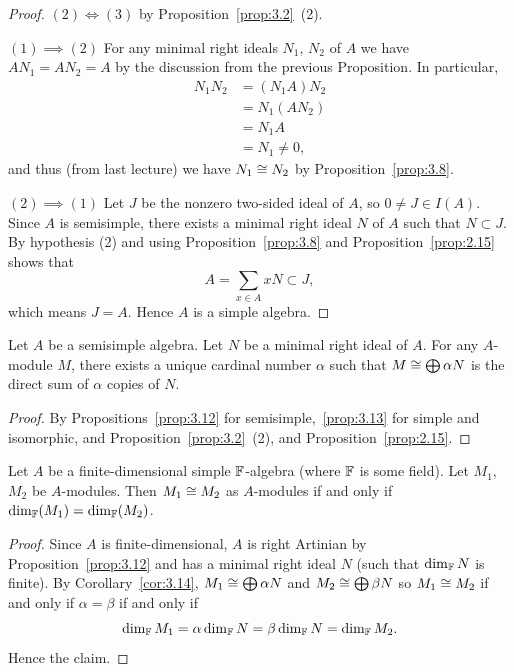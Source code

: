 \begin{proof}
$(2)\iff(3)$ by Proposition~\ref{prop:3.2}~(2).

$(1)\implies(2)$
For any minimal right ideals $N_{1}$, $N_{2}$ of $A$ we have
$AN_{1}=AN_{2}=A$ by the discussion from the previous Proposition. In particular,
\begin{subequations}
  \begin{align}
N_{1}N_{2} &= (N_{1}A)N_{2}\\
&=N_{1}(AN_{2})\\
&=N_{1}A\\
&=N_{1}\neq0,
  \end{align}
\end{subequations}
and thus (from last lecture) we have $N_{1}\cong N_{2}$ by Proposition~\ref{prop:3.8}.

$(2)\implies(1)$
Let $J$ be the nonzero two-sided ideal of $A$, so $0\neq J\in I(A)$.
Since $A$ is semisimple, there exists a minimal right ideal $N$ of $A$
such that $N\subset J$. By hypothesis (2) and using
Proposition~\ref{prop:3.8} and Proposition~\ref{prop:2.15} shows that
\begin{equation}
A=\sum_{x\in A}xN\subset J,
\end{equation}
which means $J=A$. Hence $A$ is a simple algebra.
\end{proof}

\begin{corollary}\label{cor:3.14}
Let $A$ be a semisimple algebra. Let $N$ be a minimal right ideal of
$A$. For any $A$-module $M$, there exists a unique cardinal number
$\alpha$ such that $M\cong\bigoplus\alpha N$ is the direct sum of
$\alpha$ copies of $N$.
\end{corollary}

\begin{proof}
By Propositions~\ref{prop:3.12} for semisimple,~\ref{prop:3.13} for
simple and isomorphic, and Proposition~\ref{prop:3.2}~(2),
and Proposition~\ref{prop:2.15}.
\end{proof}

\begin{corollary}\label{cor:3.15}
Let $A$ be a finite-dimensional simple $\mathbb{F}$-algebra (where $\mathbb{F}$ is
some field). Let $M_{1}$, $M_{2}$ be $A$-modules. Then $M_{1}\cong M_{2}$
as $A$-modules if and only if $\dim_{\mathbb{F}}(M_{1})=\dim_{\mathbb{F}}(M_{2})$.
\end{corollary}

\begin{proof}
Since $A$ is finite-dimensional, $A$ is right Artinian by
Proposition~\ref{prop:3.12} and has a minimal right ideal $N$ (such
that $\dim_{\mathbb{F}}N$ is finite). By Corollary~\ref{cor:3.14},
$M_{1}\cong\bigoplus\alpha N$ and $M_{2}\cong\bigoplus\beta N$ so
$M_{1}\cong M_{2}$ if and only if $\alpha=\beta$ if and only if
\begin{equation}
\dim_{\mathbb{F}}M_{1}=\alpha\dim_{\mathbb{F}}N=\beta\dim_{\mathbb{F}}N=\dim_{\mathbb{F}}M_{2}.
\end{equation}
Hence the claim.
\end{proof}

